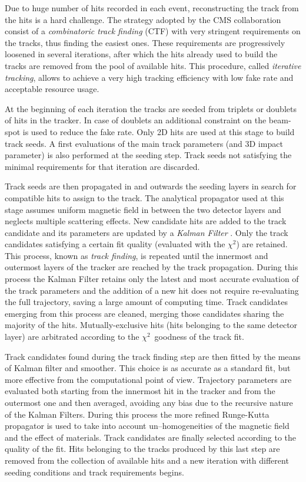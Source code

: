 Due to huge number of hits recorded in each event, reconstructing the track from the hits is a hard challenge. The strategy adopted by the CMS collaboration consist of a \emph{combinatoric track finding} (CTF) with very stringent requirements on the tracks, thus finding the easiest ones. These requirements are progressively loosened in several iterations, after which the hits already used to build the tracks are removed from the pool of available hits. This procedure, called \emph{iterative tracking}, allows to achieve a very high tracking efficiency with low fake rate and acceptable resource usage. 

At the beginning of each iteration the tracks are seeded from triplets or doublets of hits in the tracker. In case of doublets an additional constraint on the beam-spot is used to reduce the fake rate. Only 2D hits are used at this stage to build track seeds. A first evaluations of the main track parameters (\pT and 3D impact parameter) is also performed at the seeding step. Track seeds not satisfying the minimal requirements for that iteration are discarded.

Track seeds are then propagated in and outwards the seeding layers in search for compatible hits to assign to the track. The analytical propagator used at this stage assumes uniform magnetic field in between the two detector layers and neglects multiple scattering effects. New candidate hits are added to the track candidate and its parameters are updated by a \emph{Kalman Filter} \cite{Fruhwirth:1987fm}. Only the track candidates satisfying a certain fit quality (evaluated with the $\chi^2$) are retained. This process, known as \emph{track finding}, is repeated until the innermost and outermost layers of the tracker are reached by the track propagation. During this process the Kalman Filter retains only the latest and most accurate evaluation of the track parameters and the addition of a new hit does not require re-evaluating the full trajectory, saving a large amount of computing time. Track candidates emerging from this process are cleaned, merging those candidates sharing the majority of the hits. Mutually-exclusive hits (hits belonging to the same detector layer) are arbitrated according to the $\chi^2$\ goodness of the track fit.

Track candidates found during the track finding step are then fitted by the means of Kalman filter and smoother. This choice is as accurate as a standard fit, but more effective from the computational point of view. Trajectory parameters are evaluated both starting from the innermost hit in the tracker and from the outermost one and then averaged, avoiding any bias due to the recursive nature of the Kalman Filters. During this process the more refined Runge-Kutta propagator is used to take into account un--homogeneities of the magnetic field and the effect of materials. Track candidates are finally selected according to the quality of the fit. Hits belonging to the tracks produced by this last step are removed from the collection of available hits and a new iteration with different seeding conditions and track requirements begins. 

